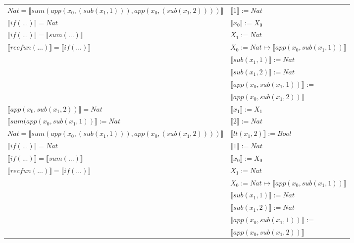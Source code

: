 \begin{exercise}
\begin{description}
\begin{center}
\begin{longtable}{ | l | l | }
                        $Nat =  \llbracket sum(app(x_0, (sub(x_1,1))), app(x_0, (sub(x_1,2)))) \rrbracket$ &    $ \llbracket 1 \rrbracket := Nat$\\
                        $ \llbracket if(...) \rrbracket = Nat$ &  $ \llbracket x_0 \rrbracket := X_0$\\ 
                        $ \llbracket if(...) \rrbracket =  \llbracket sum(...) \rrbracket$ &  $X_1 := Nat$\\ 
                        $ \llbracket recfun(...) \rrbracket =  \llbracket if(...) \rrbracket$ &  $X_0 := Nat \mapsto  \llbracket app(x_0, sub(x_1,1)) \rrbracket$\\ 
                        &  $ \llbracket sub(x_1,1) \rrbracket := Nat$\\ 
                        &  $ \llbracket sub(x_1,2) \rrbracket := Nat$ \\
			     &  $ \llbracket app(x_0, sub(x_1,1)) \rrbracket$ := \\
			     &  $ \llbracket app(x_0, sub(x_1,2)) \rrbracket$\\
                    \hline
                        $ \llbracket app(x_0, sub(x_1,2)) \rrbracket = Nat$ &  $ \llbracket x_1 \rrbracket := X_1$\\   
                        $ \llbracket sum(app(x_0, sub(x_1,1)) \rrbracket := Nat$ &  $ \llbracket 2 \rrbracket := Nat$\\
                        $Nat =  \llbracket sum(app(x_0, (sub(x_1,1))), app(x_0, (sub(x_1,2)))) \rrbracket$ & $ \llbracket lt(x_1 , 2) \rrbracket := Bool$\\
                        $ \llbracket if(...) \rrbracket = Nat$ &   $ \llbracket 1 \rrbracket := Nat$\\ 
                        $ \llbracket if(...) \rrbracket =  \llbracket sum(...) \rrbracket$ & $ \llbracket x_0 \rrbracket := X_0$\\
                        $ \llbracket recfun(...) \rrbracket =  \llbracket if(...) \rrbracket$ &  $X_1 := Nat$\\
                        & $X_0 := Nat \mapsto  \llbracket app(x_0, sub(x_1,1)) \rrbracket$\\ 
                        & $ \llbracket sub(x_1,1) \rrbracket := Nat$\\
			     & $ \llbracket sub(x_1,2) \rrbracket := Nat$ \\
			     & $ \llbracket app(x_0, sub(x_1,1)) \rrbracket$ := \\
			     & $ \llbracket app(x_0, sub(x_1,2)) \rrbracket$\\ 

\end{longtable}
\end{center}
\end{description}
\end{exercise}
